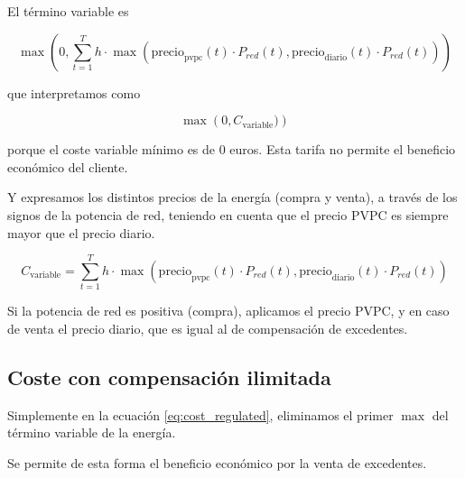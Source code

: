 El término variable es

\begin{equation}
	\max \left(0, \sum_{t=1}^{T} h \cdot \max(\text{precio}_\text{pvpc}(t) \cdot P_{red}(t), \text{precio}_\text{diario}(t) \cdot P_{red}(t)) \right)
\end{equation}


que interpretamos como

\begin{equation}
	\max \left(0, C_{\text{variable}}) \right)
\end{equation}

porque el coste variable mínimo es de 0 euros. Esta tarifa no permite el
beneficio económico del cliente.

Y expresamos los distintos precios de la energía (compra y venta), a través de
los signos de la potencia de red, teniendo en cuenta que el precio PVPC es
siempre mayor que el precio diario.

\begin{equation}
	C_{\text{variable}} = \sum_{t=1}^T h \cdot \max(\text{precio}_\text{pvpc}(t) \cdot P_{red}(t), \text{precio}_\text{diario}(t) \cdot P_{red}(t))
\end{equation}

Si la potencia de red es positiva (compra), aplicamos el precio PVPC, y en caso
de venta el precio diario, que es igual al de compensación de excedentes.


\subsection{Coste con compensación ilimitada}

Simplemente en la ecuación \ref{eq:cost_regulated}, eliminamos el primer $\max$
del término variable de la energía.

Se permite de esta forma el beneficio económico por la venta de excedentes.

